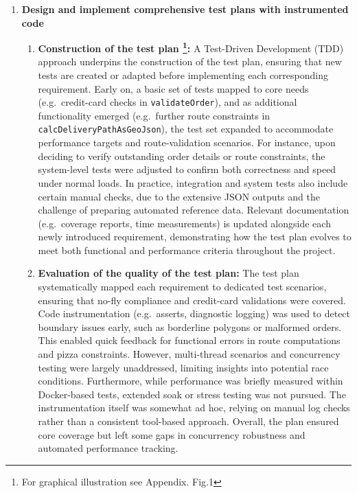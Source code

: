 \documentclass{article}
\begin{document}
\begin{enumerate}
\item \textbf{Design and implement comprehensive test plans with instrumented code} \marginpar{[default 20\%]}
\begin{enumerate}
\item \textbf{Construction of the test plan \footnote{For graphical illustration see Appendix. Fig.1}:}
A Test-Driven Development (TDD) approach underpins the construction of the test plan, ensuring
that new tests are created or adapted before implementing each corresponding requirement.
Early on, a basic set of tests mapped to core needs (e.g.\ credit-card checks in \texttt{validateOrder}),
and as additional functionality emerged (e.g.\ further route constraints in \texttt{calcDeliveryPathAsGeoJson}),
the test set expanded to accommodate performance targets and route-validation scenarios.
For instance, upon deciding to verify outstanding order details or route constraints, the system-level
tests were adjusted to confirm both correctness and speed under normal loads. In practice,
integration and system tests also include certain manual checks, due to the extensive JSON outputs
and the challenge of preparing automated reference data. Relevant documentation (e.g.\ coverage
reports, time measurements) is updated alongside each newly introduced requirement, demonstrating
how the test plan evolves to meet both functional and performance criteria throughout the project. 

\item \textbf{Evaluation of the quality of the test plan:}
The test plan systematically mapped each requirement to dedicated test scenarios, ensuring
that no-fly compliance and credit-card validations were covered. Code instrumentation
(e.g.\ asserts, diagnostic logging) was used to detect boundary issues early, such as borderline
polygons or malformed orders. This enabled quick feedback for functional errors in route
computations and pizza constraints. However, multi-thread scenarios and concurrency testing
were largely unaddressed, limiting insights into potential race conditions. Furthermore,
while performance was briefly measured within Docker-based tests, extended soak or stress
testing was not pursued. The instrumentation itself was somewhat ad hoc, relying on manual
log checks rather than a consistent tool-based approach. Overall, the plan ensured core
coverage but left some gaps in concurrency robustness and automated performance tracking.


\end{enumerate}
\end{enumerate}
\end{document}

